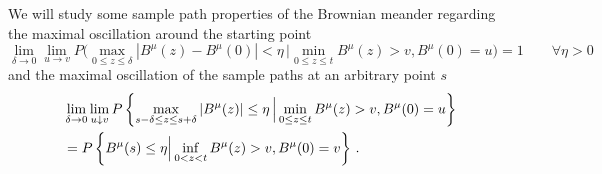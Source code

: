 We will study some sample path properties of the Brownian meander regarding the maximal oscillation around the starting point 
\begin{equation}\label{eq:lemma-cond-intro}
\lim_{\delta \to 0}
\lim_{u \to v} 
P \Big( \max_{0\leq z \leq \delta } | B^\mu ( z) - B^\mu(0)  | < \eta  \, \Big | 
\min_{ 0\leq z \leq t} B^\mu ( z) > v ,  B^\mu(0) = u \Big) = 1 \qquad \forall \eta > 0
\end{equation}
%
%
and the maximal oscillation of the sample paths at an arbitrary point $ s $
\begin{align}
& \lim_{\delta \to 0} \lim_{ u \downarrow v} P \left\{  \max_{s - \delta \leq z \leq s +\delta } |B^\mu (z) | \leq \eta \,\Big | \min_{ 0 \leq z \leq t } B^\mu(z) > v, B^\mu (0) = u\right\} 
\\
&= 
P\left\{ B^\mu (s ) \leq \eta \Big  | \inf_{ 0 < z < t } B^\mu(z) > v, B^\mu(0) = v \right\} \, .
\notag 
\end{align}


